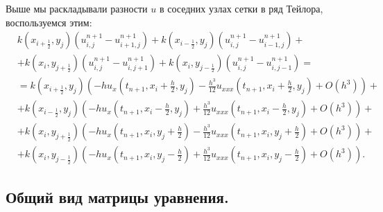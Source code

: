 \documentclass[14pt,a4paper]{extarticle}
\newcommand{\1}{\mathbbm{1}}
\begin{document}
Выше мы раскладывали разности $u$ в соседних узлах сетки в ряд Тейлора, воспользуемся этим:
\begin{align*}
    &k(x_{i + \frac{1}{2}}, y_{j}) \left(u^{n+1}_{i, j} - u^{n+1}_{i+1,j} \right) +
     k(x_{i- \frac{1}{2}}, y_{j}) \left(u^{n+1}_{i, j} - u^{n+1}_{i-1, j}\right) +\\
    &+
    k(x_{i}, y_{j+ \frac{1}{2}}) \left(u^{n+1}_{i, j} - u^{n+1}_{i,j+1} \right) +
    k(x_{i}, y_{j- \frac{1}{2}}) \left(u^{n+1}_{i, j} - u^{n+1}_{i, j-1}\right) =\\
    &= k(x_{i + \frac{1}{2}}, y_{j}) \left(- h u_x(t_{n+1}, x_i + \frac{h}{2}, y_j) - \frac{h^3}{12}u_{xxx}(t_{n+1}, x_i + \frac{h}{2}, y_j) + O(h^3) \right) + \\
    &+ k(x_{i - \frac{1}{2}}, y_{j}) \left(- h u_x(t_{n+1}, x_i - \frac{h}{2}, y_j) + \frac{h^3}{12}u_{xxx}(t_{n+1}, x_i - \frac{h}{2}, y_j) + O(h^3) \right) + \\
    &+ k(x_{i}, y_{j+ \frac{1}{2}})  \left(- h u_x(t_{n+1}, x_i, y_j + \frac{h}{2}) - \frac{h^3}{12}u_{xxx}(t_{n+1}, x_i, y_j + \frac{h}{2}) + O(h^3) \right) + \\
    &+ k(x_{i}, y_{j - \frac{1}{2}}) \left(- h u_x(t_{n+1}, x_i, y_j - \frac{h}{2}) + \frac{h^3}{12}u_{xxx}(t_{n+1}, x_i, y_j - \frac{h}{2}) + O(h^3) \right).
\end{align*}

\subsection{Общий вид матрицы уравнения.} \label{generalmatrix2d}
\end{document}
